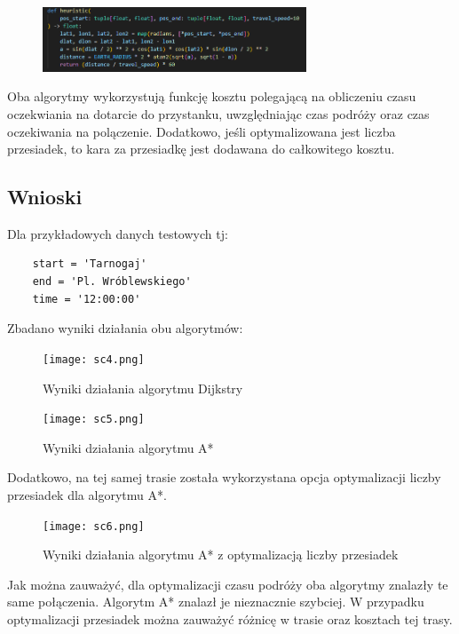 \documentclass{article}
\begin{document}
\begin{figure}[H]
    \centering
    \includegraphics[width=0.7\textwidth]{sc3.png}
\end{figure}

Oba algorytmy wykorzystują funkcję kosztu polegającą na obliczeniu czasu oczekwiania na dotarcie do przystanku, uwzględniając czas podróży oraz czas oczekiwania na polączenie. Dodatkowo, jeśli
optymalizowana jest liczba przesiadek, to kara za przesiadkę jest dodawana do całkowitego kosztu.

\subsection*{Wnioski}
Dla przykładowych danych testowych tj:
\begin{verbatim}
    start = 'Tarnogaj'
    end = 'Pl. Wróblewskiego'
    time = '12:00:00'
\end{verbatim}
Zbadano wyniki działania obu algorytmów:
\begin{figure}[H]
    \centering
    \texttt{[image: sc4.png]}
    \caption{Wyniki działania algorytmu Dijkstry}
\end{figure}

\begin{figure}[H]
    \centering
    \texttt{[image: sc5.png]}
    \caption{Wyniki działania algorytmu A*}
\end{figure}





Dodatkowo, na tej samej trasie została wykorzystana opcja optymalizacji liczby przesiadek dla algorytmu A*.
\begin{figure}[H]
    \centering
    \texttt{[image: sc6.png]}
    \caption{Wyniki działania algorytmu A* z optymalizacją liczby przesiadek}
\end{figure}
Jak można zauważyć, dla optymalizacji czasu podróży oba algorytmy znalazły te same połączenia. Algorytm A* znalazł je nieznacznie szybciej.
W przypadku optymalizacji przesiadek można zauważyć różnicę w trasie oraz kosztach tej trasy.
\end{document}
